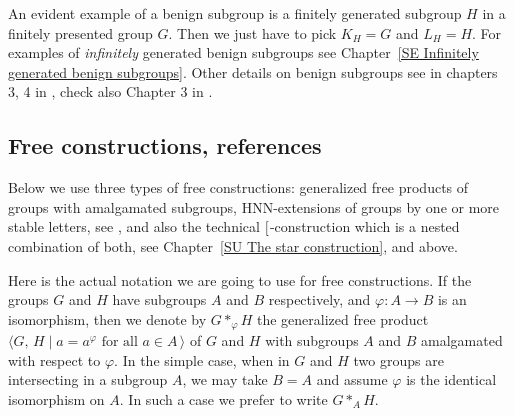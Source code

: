 \documentclass[12pt, a4paper]{amsart}
\newcommand{\1}{\{1\}}
\newcommand{\bigast}{\textrm{\footnotesize\ding{91}}}
\theoremstyle{plain}
\theoremstyle{definition}
\theoremstyle{remark}
\numberwithin{equation}{section}
\begin{document}
An evident example of a benign subgroup is a finitely generated subgroup $H$ in a finitely presented group $G$. Then we just have to pick $K_H=G$ and $L_H=H$.
%
For examples of \textit{infinitely} generated benign subgroups see Chapter~\ref{SE Infinitely generated benign subgroups}.
%
Other details on benign subgroups see in chapters 3, 4 in \cite{Higman Subgroups of fP groups}, check also Chapter 3 in \cite{A modified proof for Higman}.











\subsection{Free constructions, references}
\label{SU Free constructions references}

Below we use three types of free constructions: 
generalized free products of groups with amalgamated subgroups,
HNN-extensions of groups by one or more stable letters, see \cite{Lyndon Schupp, 
Bogopolski,
Rotman, 
De La Harpe 2000}, 
and also the technical $\bigast$-construction which is a nested combination of both, see Chapter~\ref{SU The star construction}, and \textit{} above.

Here is the actual notation we are going to use for free constructions.
%
If the groups $G$ and $H$ have subgroups $A$ and $B$ respectively, and $\varphi : A \to B$ is an isomorphism, then we denote by $G*_{\varphi} H$ the generalized free product $\langle G,\, H \mathrel{|} a=a^{\varphi} \text{ for all $a\in A$}\, \rangle$ of $G$ and $H$ with subgroups $A$ and $B$ amalgamated with respect to $\varphi$. In the simple case, when in $G$ and $H$ two groups are intersecting in a subgroup $A$, we may take $B=A$ and assume $\varphi$ is the identical isomorphism on $A$. In such a case we prefer to write $G*_{A} H$.
\end{document}
